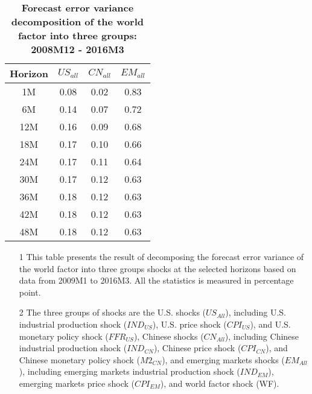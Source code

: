 \documentclass[12pt]{article}
\numberwithin{equation}{section}
\begin{document}
\begin{table}[htbp]
    \centering
\caption{\textbf{Forecast error variance decomposition of the world factor into three groups: 2008M12 - 2016M3}}
  \begin{tabularx}{\textwidth}{@{\extracolsep{\fill}}cccc}
    \hline\hline
Horizon	&	$US_{all}$	&					$CN_{all}$	&					$EM_{all}$					\\	\hline
1M	&	0.08 	&					0.02 	&					0.83 					\\	
6M	&	0.14 	&					0.07 	&					0.72 					\\	
12M	&	0.16 	&					0.09 	&					0.68 					\\	
18M	&	0.17 	&					0.10 	&					0.66 					\\	
24M	&	0.17 	&					0.11 	&					0.64 					\\	
30M	&	0.17 	&					0.12 	&					0.63 					\\	
36M	&	0.18 	&					0.12 	&					0.63 					\\	
42M	&	0.18 	&					0.12 	&					0.63 					\\	
48M	&	0.18 	&					0.12 	&					0.63 					\\	
\hline\hline
    \end{tabularx}%
  \label{tab:vd_after_3}%

  \begin{minipage}{\textwidth}
{			
    \begin{itemize}
\item[1] This table presents the result of decomposing the forecast error variance of the world factor into three groups shocks at the selected horizons based on data from 2009M1 to 2016M3. All the statistics is measured in percentage point.
\item[2] The three groups of shocks are  the U.S. shocks ($US_{All}$), including U.S. industrial production shock ($IND_{US}$), U.S. price shock ($CPI_{US}$), and U.S. monetary policy shock ($FFR_{US}$), Chinese shocks ($CN_{All}$), including Chinese industrial production shock ($IND_{CN}$), Chinese price shock ($CPI_{CN}$), and Chinese monetary policy shock ($M2_{CN}$), and emerging markets shocks ($EM_{All}$), including emerging markets industrial production shock ($IND_{EM}$), emerging markets price shock ($CPI_{EM}$), and world factor shock (WF).

\end{itemize}
}
\end{minipage}

\end{table}%
\end{document}
